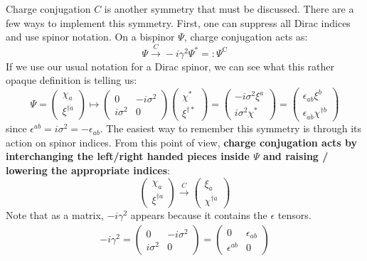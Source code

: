 \documentclass[11pt, oneside]{article}   	%
\theoremstyle{definition}
\begin{document}
Charge conjugation $C$ is another symmetry that must be discussed. There are a few ways to implement this symmetry. First, one can 
suppress all Dirac indices and use spinor notation. On a bispinor $\Psi$, charge conjugation acts as:
\begin{equation}
	\Psi\xrightarrow{C} -i\gamma^2\Psi^* =: \Psi^\mathrm{C}
\end{equation}
If we use our usual notation for a Dirac spinor, we can see what this rather opaque definition is telling us:
\begin{equation}
	\Psi = \begin{pmatrix} \chi_a \\ \xi^{\dagger \dot a} \end{pmatrix} \mapsto \begin{pmatrix} 0 & -i\sigma^2 \\ i\sigma^2 & 0 \end{pmatrix} 
	\begin{pmatrix} \chi^* \\ \xi^{\dagger *} \end{pmatrix} 
	= \begin{pmatrix} -i\sigma^2 \xi^{a} \\ i\sigma^2\chi^* \end{pmatrix}
	= \begin{pmatrix} \epsilon_{a b} \xi^{b} \\ \epsilon_{\dot a\dot b} \chi^{\dagger \dot b} \end{pmatrix}
\end{equation}
since $\epsilon^{ab} = i\sigma^2 = -\epsilon_{ab}$. The easiest way to remember this symmetry is through its action on spinor indices. 
From this point of view, \textbf{charge conjugation acts by interchanging the left/right handed pieces inside $\Psi$ and raising / lowering 
the appropriate indices}:
\begin{equation}
	\begin{pmatrix} \chi_a \\ \xi^{\dagger\dot a} \end{pmatrix} \xrightarrow{C} \begin{pmatrix} \xi_a \\ \chi^{\dagger\dot a} \end{pmatrix}
\end{equation}
Note that as a matrix, $-i\gamma^2$ appears because it contains the $\epsilon$ tensors. 
\begin{align}
	-i\gamma^2 = \begin{pmatrix} 0 & -i\sigma^2 \\ i\sigma^2 & 0 \end{pmatrix} = \begin{pmatrix} 0 & \epsilon_{ab} \\ \epsilon^{ab} & 0 
	\end{pmatrix}
\end{align}
\end{document}
